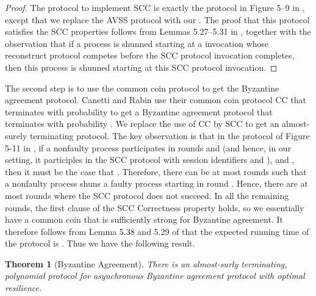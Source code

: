 \documentclass{sig-alternate}
\newtheorem{theorem}{Theorem}
\newcommand{\davss}{{\text{SVSS}}\xspace}
\begin{document}
\begin{proof}
The protocol to implement SCC is exactly the protocol in Figure 5--9
in \cite{Can-thesis}, except that we replace the AVSS protocol
with our \davss. The proof
that this protocol satisfies the SCC properties
follows from
Lemmas 5.27--5.31 in \cite{Can-thesis}, together with the
observation that if a process is shunned starting at a \davss invocation
whose reconstruct protocol competes before the SCC protocol invocation
completes, then this process is shunned starting at this SCC protocol
invocation.
\begin{comment}
following observation.

If a \davss share invocation  is an attached secret of a
process  (see line 2 of figure 5--9 for the definition of attach) for
some invocation  of protocol SCC, and  belongs to some set
 (see figure 5--9 for the use of ) then the
invocation  of \davss must begin after the invocation 
of FD, and  must end before  does.
Hence, if some faulty process  is shunned by some nonfaulty process
 in , then  is also shunned by  in .
On the other hand,
if no such \davss invocation  is shunned during invocation ,
then the arguments of
Canetti apply.
\end{comment}
\end{proof}

The second step is to use the common coin protocol to get the Byzantine
agreement
protocol.  Canetti and Rabin use their
common coin protocol CC that terminates with probability  to
get a Byzantine agreement protocol that
terminates with probability .  We replace the use of
CC by SCC to get an almost-surely terminating protocol.
The key observation is that in the protocol of Figure 5-11 in
\cite{Can-thesis}, if a nonfaulty process 
participates in rounds  and  (and hence, in our setting, it
participles in the SCC protocol with session identifiers  and
),
and ,
then it must be the case that
.
Therefore, there can be at most  rounds  such that a
nonfaulty process   shuns a faulty process  starting in round .
Hence, there are
at most  rounds where the SCC protocol
does not succeed. In all the remaining rounds, the first clause of the SCC
Correctness property holds,
so we essentially have a common coin that is sufficiently strong for
Byzantine agreement.
It therefore follows from Lemma 5.38 and
5.29 of \cite{Can-thesis} that
the expected running time of the protocol is  .
Thus we have the following result.

\begin{theorem}[Byzantine Agreement]
There is an
almost-surly terminating, polynomial protocol for
asynchronous Byzantine agreement protocol with optimal resilience.
\end{theorem}
\end{document}
